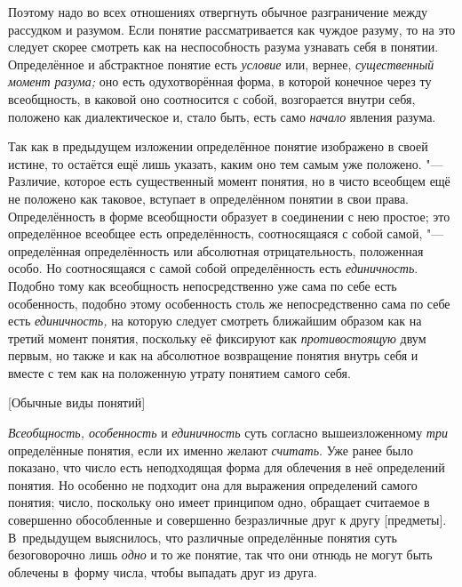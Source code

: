 Поэтому надо во всех отношениях отвергнуть обычное
разграничение между рассудком и разумом. Если понятие рассматривается как
чуждое разуму, то на это следует скорее смотреть как на неспособность
разума узнавать себя в понятии. Определённое и абстрактное понятие есть
{\em условие} или, вернее, {\em существенный момент
разума;} оно есть одухотворённая форма, в которой конечное
через ту всеобщность, в каковой оно соотносится с собой, возгорается внутри
себя, положено как диалектическое и, стало быть, есть само
{\em начало} явления разума.

Так как в предыдущем изложении определённое понятие изображено
в своей истине, то остаётся ещё лишь указать, каким оно тем самым уже
положено. "--- Различие, которое есть существенный момент
понятия, но в чисто всеобщем ещё не положено как таковое, вступает в
определённом понятии в свои права. Определённость в форме всеобщности
образует в соединении с нею простое; это определённое
всеобщее есть определённость, соотносящаяся с собой самой, "---
определённая определённость или абсолютная отрицательность,
положенная особо. Но соотносящаяся с самой собой определённость есть
{\em единичность}.
Подобно тому как всеобщность непосредственно уже сама по себе
есть особенность, подобно этому особенность столь же непосредственно сама
по себе есть {\em единичность,}
на которую следует смотреть ближайшим образом как на третий
момент понятия, поскольку её фиксируют как {\em противостоящую} двум
первым, но также и как на абсолютное возвращение понятия внутрь себя и
вместе с тем как на положенную утрату понятием самого себя.

%
{[Обычные виды понятий]}

{\em Всеобщность, особенность} и {\em единичность} суть согласно
вышеизложенному {\em три} определённые понятия, если их именно желают
{\em считать}. Уже ранее было показано, что число есть неподходящая форма для
облечения в неё определений понятия. Но особенно не подходит она для выражения определений самого
понятия; число, поскольку оно имеет принципом одно, обращает считаемое в
совершенно обособленные и совершенно безразличные друг к другу [предметы].
В~предыдущем выяснилось, что различные определённые понятия суть безоговорочно
лишь {\em одно} и то же понятие, так что они отнюдь не могут быть облечены
в~форму числа, чтобы выпадать друг из друга.

